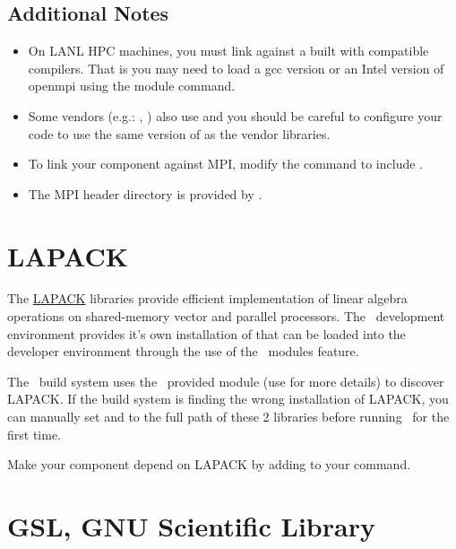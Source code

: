 \subsection{Additional Notes}
\begin{itemize}
\item On LANL HPC machines, you must link against a   built with compatible compilers.  That is you may need to load a gcc version or an Intel version of openmpi using the module command.
\item Some vendors (e.g.: , ) also use  and you should be careful to configure your code to use the same version of  as the vendor libraries. 
\item To link your component against MPI, modify the  command to include .
\item The MPI header directory is provided by .
\end{itemize}


\section{LAPACK}
\label{appsec:lapack}  

The \href{http://www.netlib.org/lapack/}{LAPACK} libraries provide efficient implementation of linear algebra operations on shared-memory vector and parallel processors. The \draco\ development environment provides it's own installation of  that can be loaded into the developer environment through the use of the \draco\ modules feature.

The \draco\ build system uses the \cmake\ provided  module (use  for more details) to discover LAPACK.  If the build system is finding the wrong installation of LAPACK, you can manually set  and  to the full path of these 2 libraries before running \cmake\ for the first time.

Make your component depend on LAPACK by adding  to your  command.


\section{GSL, GNU Scientific Library}
\label{appsec:gsl}


